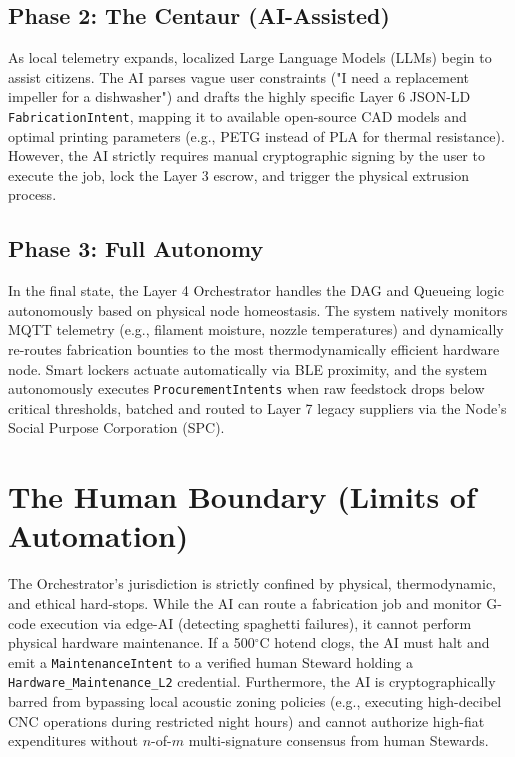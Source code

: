 \subsection{Phase 2: The Centaur (AI-Assisted)}
As local telemetry expands, localized Large Language Models (LLMs) begin to assist citizens. The AI parses vague user constraints ("I need a replacement impeller for a dishwasher") and drafts the highly specific Layer 6 JSON-LD \texttt{FabricationIntent}, mapping it to available open-source CAD models and optimal printing parameters (e.g., PETG instead of PLA for thermal resistance). However, the AI strictly requires manual cryptographic signing by the user to execute the job, lock the Layer 3 escrow, and trigger the physical extrusion process.

\subsection{Phase 3: Full Autonomy}
In the final state, the Layer 4 Orchestrator handles the DAG and Queueing logic autonomously based on physical node homeostasis. The system natively monitors MQTT telemetry (e.g., filament moisture, nozzle temperatures) and dynamically re-routes fabrication bounties to the most thermodynamically efficient hardware node. Smart lockers actuate automatically via BLE proximity, and the system autonomously executes \texttt{ProcurementIntents} when raw feedstock drops below critical thresholds, batched and routed to Layer 7 legacy suppliers via the Node's Social Purpose Corporation (SPC).

\section{The Human Boundary (Limits of Automation)}
The Orchestrator's jurisdiction is strictly confined by physical, thermodynamic, and ethical hard-stops. While the AI can route a fabrication job and monitor G-code execution via edge-AI (detecting spaghetti failures), it cannot perform physical hardware maintenance. If a 500$^\circ$C hotend clogs, the AI must halt and emit a \texttt{MaintenanceIntent} to a verified human Steward holding a \texttt{Hardware\_Maintenance\_L2} credential. Furthermore, the AI is cryptographically barred from bypassing local acoustic zoning policies (e.g., executing high-decibel CNC operations during restricted night hours) and cannot authorize high-fiat expenditures without $n$-of-$m$ multi-signature consensus from human Stewards.

